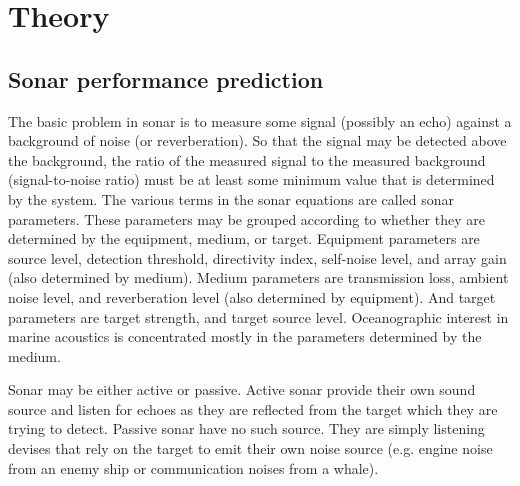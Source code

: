\chapter{Theory} \label{Theory}

\section{ Sonar performance prediction } \label{ Sonar performance prediction }

\noindent The basic problem in sonar is to measure some signal (possibly an echo) against a background of noise (or reverberation). So that the signal may be detected above the background, the ratio of the measured signal to the measured background (signal-to-noise ratio) must be at least some minimum value that is determined by the system. The various terms in the sonar equations are called sonar parameters. These parameters may be grouped according to whether they are determined by the equipment, medium, or target. Equipment parameters are source level, detection threshold, directivity index, self-noise level, and array gain (also determined by medium). Medium parameters are transmission loss, ambient noise level, and reverberation level (also determined by equipment). And target parameters are target strength, and target source level. Oceanographic interest in marine acoustics is concentrated mostly in the parameters determined by the medium.

\noindent Sonar may be either active or passive. Active sonar provide their own sound source and listen for echoes as they are reflected from the target which they are trying to detect. Passive sonar have no such source. They are simply listening devises that rely on the target to emit their own noise source (e.g. engine noise from an enemy ship or communication noises from a whale).

